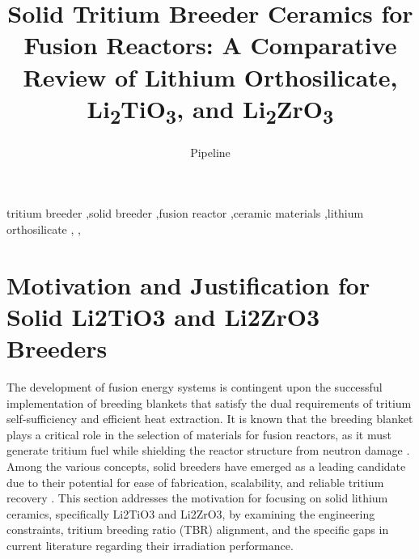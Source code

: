 \documentclass[review,12pt,a4paper]{elsarticle}
\begin{document}
\begin{frontmatter}

\title{Solid Tritium Breeder Ceramics for Fusion Reactors: A Comparative Review of Lithium Orthosilicate, Li\textsubscript{2}TiO\textsubscript{3}, and Li\textsubscript{2}ZrO\textsubscript{3}}

\author[a]{Pipeline}


\begin{abstract}
\end{abstract}

\begin{keyword}
tritium breeder \sep solid breeder \sep fusion reactor \sep ceramic materials
\sep lithium orthosilicate \sep {} \sep {}
\end{keyword}

\end{frontmatter}

\section{Motivation and Justification for Solid Li2TiO3 and Li2ZrO3 Breeders}


\textcolor{highconf}{The development of fusion energy systems is contingent upon the successful implementation of breeding blankets that satisfy the dual requirements of tritium self-sufficiency and efficient heat extraction. It is known that the breeding blanket plays a critical role in the selection of materials for fusion reactors, as it must generate tritium fuel while shielding the reactor structure from neutron damage \citep{zhao_burnup_2013}. Among the various concepts, solid breeders have emerged as a leading candidate due to their potential for ease of fabrication, scalability, and reliable tritium recovery \citep{zhao_burnup_2013}. This section addresses the motivation for focusing on solid lithium ceramics, specifically Li2TiO3 and Li2ZrO3, by examining the engineering constraints, tritium breeding ratio (TBR) alignment, and the specific gaps in current literature regarding their irradiation performance.}
\end{document}
